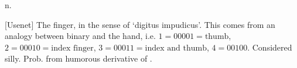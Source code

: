  n.

[Usenet] The finger, in the sense of `digitus impudicus'. This comes from an
analogy between binary and the hand, i.e. $1=00001=\mbox{thumb}$,
$2=00010=\mbox{index finger}$, $3=00011=\mbox{index and thumb}$, $4=00100$.
Considered silly. Prob. from humorous derivative of .

